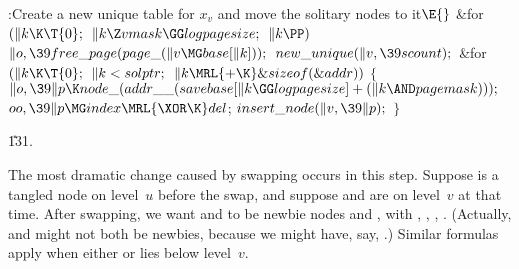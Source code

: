\B{}:Create a new unique table for $x_v$ and move the
solitary nodes to it\X${}\E{}$\6
\&{for} ${}(\|k\K\T{0};{}$ ${}\|k\Z\\{vmask}\GG\\{logpagesize};{}$ ${}\|k%
\PP){}$\1\5
${}\|o,\39\\{free\_page}(\\{page\_}(\|v\MG\\{base}[\|k]));{}$\2\6
${}\\{new\_unique}(\|v,\39\\{scount});{}$\6
\&{for} ${}(\|k\K\T{0};{}$ ${}\|k<\\{solptr};{}$ ${}\|k\MRL{+{\K}}\&{sizeof}(%
\&{addr})){}$\5
${}\{{}$\1\6
${}\|o,\39\|p\K\\{node\_}(\\{addr\_\_}(\\{savebase}[\|k\GG\\{logpagesize}]+(\|k%
\AND\\{pagemask})));{}$\6
${}\\{oo},\39\|p\MG\\{index}\MRL{{\XOR}{\K}}\\{del}{}$;\6
${}\\{insert\_node}(\|v,\39\|p);{}$\6
\4${}\}{}$\2\par
\U131.\fi

The most dramatic change caused by swapping occurs in this
step.
Suppose  is a tangled node on level~$u$ before the swap, and suppose
 and  are on level~$v$ at that
time. After swapping, we want
 and  to be newbie nodes  and %
,
with , , , .
(Actually,  and  might not both be newbies, because
we might have, say, .)
Similar formulas apply when either  or  lies below level~$v$.

